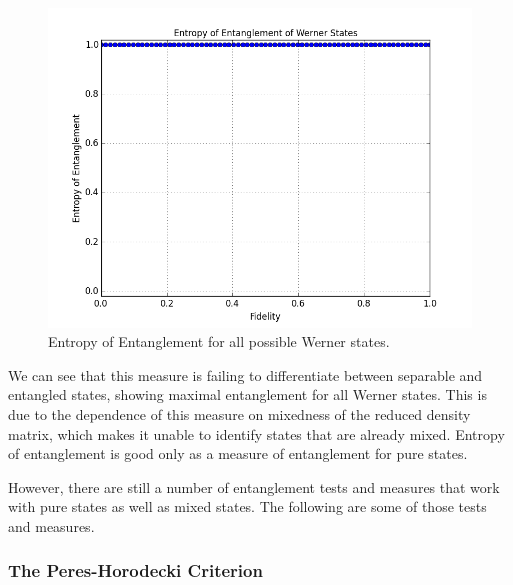 \begin{figure}[H]
  \begin{center}
    \includegraphics[scale=0.62]{figures/wernerstates-entropyentg.png}
    \caption{Entropy of Entanglement for all possible Werner states.}
    \label{fig: Werner States: Entropy of Entanglement}
  \end{center}
\end{figure}
We can see that this measure is failing to differentiate between separable and entangled states, showing maximal entanglement for all Werner states. This is due to the dependence of this measure on mixedness of the reduced density matrix, which makes it unable to identify states that are already mixed. Entropy of entanglement is good only as a measure of entanglement for pure states.
\newline
\par However, there are still a number of entanglement tests and measures that work with pure states as well as mixed states. The following are some of those tests and measures.


\subsubsection{The Peres-Horodecki Criterion}

